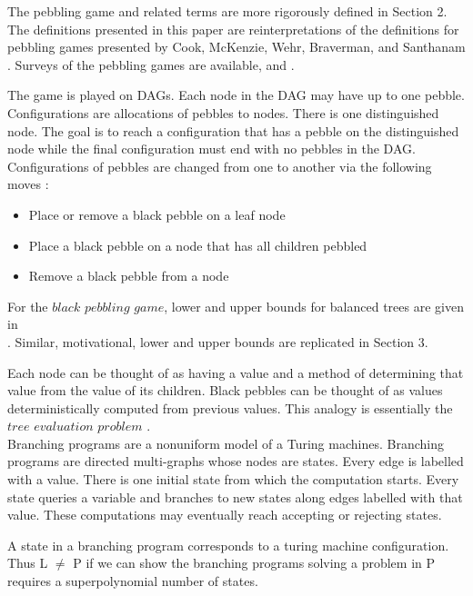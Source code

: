 \documentclass[12pt]{article}
\begin{document}
The pebbling game and related terms are more rigorously defined in Section 2. The definitions presented in this paper are reinterpretations of the definitions for pebbling games presented by Cook, McKenzie, Wehr, Braverman, and Santhanam \cite{c:pebjournal}. Surveys of the pebbling games are available, \cite{ppgr:survey} and \cite{nord:survey2}.

The game is played on DAGs. Each node in the DAG may have up to one pebble. Configurations are allocations of pebbles to nodes. There is one distinguished node. The goal is to reach a configuration that has a pebble on the distinguished node while the final configuration must end with no pebbles in the DAG. Configurations of pebbles are changed from one to another via the following moves : 

\begin{itemize}

\item
Place or remove a black pebble on a leaf node

\item
Place a black pebble on a node that has all children pebbled

\item
Remove a black pebble from a node

\end{itemize}

For the $black$ $pebbling$ $game$, lower and upper bounds for balanced trees are given in \\\cite{c:pebjournal}. Similar, motivational, lower and upper bounds are replicated in Section 3. 

Each node can be thought of as having a value and a method of determining that value from the value of its children. Black pebbles can be thought of as values deterministically computed from previous values. This analogy is essentially the $tree$ $evaluation$ $problem$ \cite{c:pebjournal}.\\

Branching programs are a nonuniform model of a Turing machines. Branching programs are directed multi-graphs whose nodes are states. Every edge is labelled with a value. There is one initial state from which the computation starts. Every state queries a variable and branches to new states along edges labelled with that value. These computations may eventually reach accepting or rejecting states.

A state in a branching program corresponds to a turing machine configuration. Thus  L $\ne$ P if we can show the branching programs solving a problem in P requires a superpolynomial number of states. 
\end{document}
